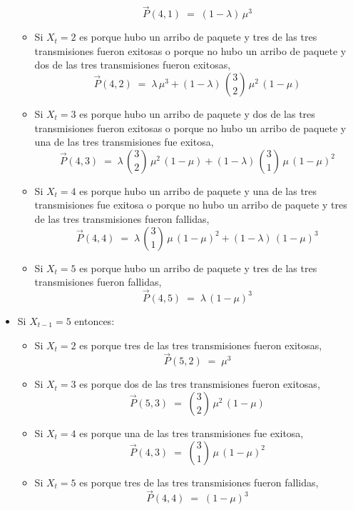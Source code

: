 \documentclass[ a4paper, twoside, 11pt]{article}
\begin{document}
\begin{problem}
\begin{itemize}
\begin{itemize}
\[
\vec{P}(4,1) \; = \; (1-\lambda) \, \mu^3
\]
\item Si $X_t = 2$ es porque hubo un arribo de paquete y tres de las tres transmisiones fueron exitosas o porque no hubo un arribo de paquete y dos de las tres transmisiones fueron exitosas, \iec
\[
\vec{P}(4,2) \; = \; \lambda \, \mu^3 + (1-\lambda) \, { 3 \choose 2 } \, \mu^2 \, (1-\mu)
\]
\item Si $X_t = 3$ es porque hubo un arribo de paquete y dos de las tres transmisiones fueron exitosas o porque no hubo un arribo de paquete y una de las tres transmisiones fue exitosa, \iec
\[
\vec{P}(4,3) \; = \; \lambda \, { 3 \choose 2 } \, \mu^2 \, (1-\mu) + (1-\lambda) \, { 3 \choose 1 } \, \mu \, (1-\mu)^2
\]
\item Si $X_t = 4$ es porque hubo un arribo de paquete y una de las tres transmisiones fue exitosa o porque no hubo un arribo de paquete y tres de las tres transmisiones fueron fallidas, \iec
\[
\vec{P}(4,4) \; = \; \lambda \, { 3 \choose 1 } \, \mu \, (1-\mu)^2 + (1-\lambda) \, (1-\mu)^3
\]
\item Si $X_t = 5$ es porque hubo un arribo de paquete y tres de las tres transmisiones fueron fallidas, \iec
\[
\vec{P}(4,5) \; = \; \lambda \, (1-\mu)^3
\]
\end{itemize}
\item Si $X_{t-1} = 5$ entonces: 
\begin{itemize}
\item Si $X_t = 2$ es porque tres de las tres transmisiones fueron exitosas, \iec
\[
\vec{P}(5,2) \; = \; \mu^3
\]
\item Si $X_t = 3$ es porque dos de las tres transmisiones fueron exitosas, \iec
\[
\vec{P}(5,3) \; = \; { 3 \choose 2 } \, \mu^2 \, (1-\mu)
\]
\item Si $X_t = 4$ es porque una de las tres transmisiones fue exitosa, \iec
\[
\vec{P}(4,3) \; = \; { 3 \choose 1 } \, \mu \, (1-\mu)^2
\]
\item Si $X_t = 5$ es porque tres de las tres transmisiones fueron fallidas, \iec
\[
\vec{P}(4,4) \; = \; (1-\mu)^3
\]
\end{itemize}
\end{itemize}


\end{problem}
\vspace{\baselineskip}
\end{document}
